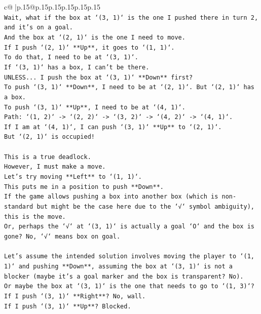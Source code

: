 \documentclass{article}
\begin{document}
{\begin{supertabular}{c@{$\;$}|p{.15\linewidth}@{}p{.15\linewidth}p{.15\linewidth}p{.15\linewidth}p{.15\linewidth}p{.15\linewidth}}
{{{\\ 
\texttt{Wait, what if the box at `(3, 1)` is the one I pushed there in turn 2, and it's on a goal.} \\
\texttt{And the box at `(2, 1)` is the one I need to move.} \\
\texttt{If I push `(2, 1)` **Up**, it goes to `(1, 1)`.} \\
\texttt{To do that, I need to be at `(3, 1)`.} \\
\texttt{If `(3, 1)` has a box, I can't be there.} \\
\texttt{UNLESS... I push the box at `(3, 1)` **Down** first?} \\
\texttt{To push `(3, 1)` **Down**, I need to be at `(2, 1)`. But `(2, 1)` has a box.} \\
\texttt{To push `(3, 1)` **Up**, I need to be at `(4, 1)`.} \\
\texttt{Path: `(1, 2)` {-}> `(2, 2)` {-}> `(3, 2)` {-}> `(4, 2)` {-}> `(4, 1)`.} \\
\texttt{If I am at `(4, 1)`, I can push `(3, 1)` **Up** to `(2, 1)`.} \\
\texttt{But `(2, 1)` is occupied!} \\
\\ 
\texttt{This is a true deadlock.} \\
\texttt{However, I must make a move.} \\
\texttt{Let's try moving **Left** to `(1, 1)`.} \\
\texttt{This puts me in a position to push **Down**.} \\
\texttt{If the game allows pushing a box into another box (which is non{-}standard but might be the case here due to the `√` symbol ambiguity), this is the move.} \\
\texttt{Or, perhaps the `√` at `(3, 1)` is actually a goal `O` and the box is gone? No, `√` means box on goal.} \\
\\ 
\texttt{Let's assume the intended solution involves moving the player to `(1, 1)` and pushing **Down**, assuming the box at `(3, 1)` is not a blocker (maybe it's a goal marker and the box is transparent? No).} \\
\texttt{Or maybe the box at `(3, 1)` is the one that needs to go to `(1, 3)`?} \\
\texttt{If I push `(3, 1)` **Right**? No, wall.} \\
\texttt{If I push `(3, 1)` **Up**? Blocked.} \\
\\ 
}}}
\end{supertabular}}
\end{document}
